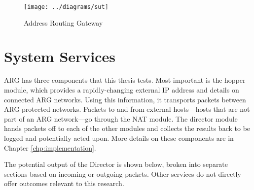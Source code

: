 \begin{figure}
	\caption{Address Routing Gateway}
	\label{fig:sut}
	\centering
	\texttt{[image: ../diagrams/sut]}
\end{figure}

\FloatBarrier
\section{System Services}
\label{sec:services}
\par \ac{ARG} has three components that this thesis tests. Most important is the hopper module, which provides a rapidly-changing external IP address and details on connected ARG networks. Using this information, it transports packets between ARG-protected networks. Packets to and from external hosts---hosts that are not part of an ARG network---go through the \ac{NAT} module. The director module hands packets off to each of the other modules and collects the results back to be logged and potentially acted upon. More details on these components are in Chapter \ref{chp:implementation}.

\par The potential output of the Director is shown below, broken into separate sections based on incoming or outgoing packets. Other services do not directly offer outcomes relevant to this research.


